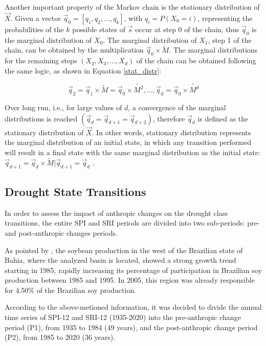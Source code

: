         Another important property of the Markov chain is the stationary distribution of $\vec{X}$. Given a vector $\vec{q}_{0} = [q_{1}, q_{2}, \dots, q_{k}]$, with $q_{i} = P(X_{0}=i)$, representing the probabilities of the $k$ possible states of $\vec{s}$ occur at step 0 of the chain, thus $\vec{q}_{0}$ is the marginal distribution of $X_{0}$. The marginal distribution of $X_{1}$, step 1 of the chain, can be obtained by the multiplication $\vec{q}_{0} \times \tilde{M}$. The marginal distributions for the remaining steps $(X_{2}, X_{3}, \dots,X_{d})$ of the chain can be obtained following the same logic, as shown in Equation \ref{stat_distr}:    
    
        \begin{equation}
            \vec{q}_{2} = \vec{q}_{1}\times\tilde{M} = \vec{q}_{0}\times\tilde{M^{2}}, \dots, \vec{q}_{d} =  \vec{q}_{0}\times\tilde{M^{d}}
            \label{stat_distr}
        \end{equation}
    
        Over long run, i.e., for large values of $d$, a convergence of the marginal distributions is reached $(\vec{q}_{d} = \vec{q}_{d+1} = \vec{q}_{d+2})$, therefore $\vec{q}_{d}$ is defined as the stationary distribution of $\vec{X}$. In other words, stationary distribution represents the marginal distribution of an initial state, in which any transition performed will result in a final state with the same marginal distribution as the initial state:  $\vec{q}_{d+1}=\vec{q}_{d}\times\tilde{M}|\vec{q}_{d+1}=\vec{q}_{d}$ \citep{Blitzstein2014}.
    
    \subsection{Drought State Transitions}

        In order to assess the impact of anthropic changes on the drought class transitions, the entire SPI and SRI periods are divided into two sub-periods: pre- and post-anthropic changes periods.
    
        As pointed by \citet{Pimentel2022}, the soybean production in the west of the Brazilian state of Bahia, where the analyzed basin is located, showed a strong growth trend starting in 1985, rapidly increasing its percentage of participation in Brazilian soy production between 1985 and 1995. In 2005, this region was already responsible for 4.50\% of the Brazilian soy production.
    
        According to the above-metioned information, it was decided to divide the annual time series of SPI-12 and SRI-12 (1935-2020) into the pre-anthropic change period (P1), from 1935 to 1984 (49 years), and the post-anthropic change period (P2), from 1985 to 2020 (36 years).


